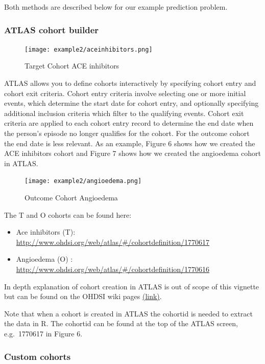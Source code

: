 \documentclass[
]{article}
\providecommand{\tightlist}{%
  \setlength{\itemsep}{0pt}\setlength{\parskip}{0pt}}
\begin{document}
Both methods are described below for our example prediction problem.

\hypertarget{atlas-cohort-builder-1}{%
\subsubsection{ATLAS cohort builder}\label{atlas-cohort-builder-1}}

\begin{figure}
\centering
\texttt{[image: example2/aceinhibitors.png]}
\caption{Target Cohort ACE inhibitors}
\end{figure}

ATLAS allows you to define cohorts interactively by specifying cohort
entry and cohort exit criteria. Cohort entry criteria involve selecting
one or more initial events, which determine the start date for cohort
entry, and optionally specifying additional inclusion criteria which
filter to the qualifying events. Cohort exit criteria are applied to
each cohort entry record to determine the end date when the person's
episode no longer qualifies for the cohort. For the outcome cohort the
end date is less relevant. As an example, Figure 6 shows how we created
the ACE inhibitors cohort and Figure 7 shows how we created the
angioedema cohort in ATLAS.

\begin{figure}
\centering
\texttt{[image: example2/angioedema.png]}
\caption{Outcome Cohort Angioedema}
\end{figure}

The T and O cohorts can be found here:

\begin{itemize}
\tightlist
\item
  Ace inhibitors (T):
  \url{http://www.ohdsi.org/web/atlas/\#/cohortdefinition/1770617}
\item
  Angioedema (O) :
  \url{http://www.ohdsi.org/web/atlas/\#/cohortdefinition/1770616}
\end{itemize}

In depth explanation of cohort creation in ATLAS is out of scope of this
vignette but can be found on the OHDSI wiki pages
\href{http://www.ohdsi.org/web/wiki/doku.php?id=documentation:software:atlas}{(link)}.

Note that when a cohort is created in ATLAS the cohortid is needed to
extract the data in R. The cohortid can be found at the top of the ATLAS
screen, e.g.~1770617 in Figure 6.

\hypertarget{custom-cohorts-1}{%
\subsubsection{Custom cohorts}\label{custom-cohorts-1}}
\end{document}
